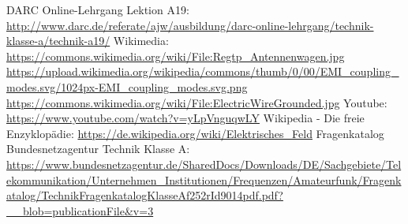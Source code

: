 \begin{thebibliography}{}
      DARC Online-Lehrgang Lektion A19:
                    \url{http://www.darc.de/referate/ajw/ausbildung/darc-online-lehrgang/technik-klasse-a/technik-a19/}
     	Wikimedia:
                    \url{https://commons.wikimedia.org/wiki/File:Regtp_Antennenwagen.jpg}
                    \url{https://upload.wikimedia.org/wikipedia/commons/thumb/0/00/EMI_coupling_modes.svg/1024px-EMI_coupling_modes.svg.png}
                    \url{https://commons.wikimedia.org/wiki/File:ElectricWireGrounded.jpg}
      Youtube:
                    \url{https://www.youtube.com/watch?v=yLpVnguqwLY}
        Wikipedia - Die freie Enzyklopädie:
                    \url{https://de.wikipedia.org/wiki/Elektrisches_Feld}
	   Fragenkatalog Bundesnetzagentur Technik Klasse A:
                    \url{https://www.bundesnetzagentur.de/SharedDocs/Downloads/DE/Sachgebiete/Telekommunikation/Unternehmen_Institutionen/Frequenzen/Amateurfunk/Fragenkatalog/TechnikFragenkatalogKlasseAf252rId9014pdf.pdf?__blob=publicationFile&v=3}
\end{thebibliography}


